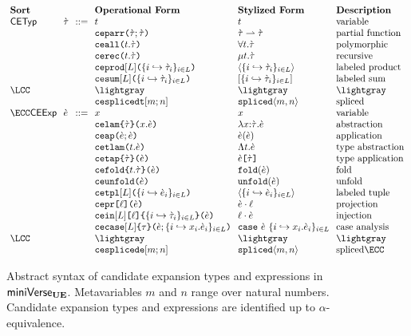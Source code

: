 \begin{enumerate}
\begin{figure}[p]
\hspace{-5px}$\arraycolsep=3.5pt\begin{array}{lllllll}
\textbf{Sort} & & & \textbf{Operational Form} & \textbf{Stylized Form} & \textbf{Description}\\
\mathsf{CETyp} & \ctau & ::= & t & t & \text{variable}\\
&&& \aceparr{\ctau}{\ctau} & \parr{\ctau}{\ctau} & \text{partial function}\\
&&& \aceall{t}{\ctau} & \forallt{t}{\ctau} & \text{polymorphic}\\
&&& \acerec{t}{\ctau} & \rect{t}{\ctau} & \text{recursive}\\
&&& \aceprod{\labelset}{\mapschema{\ctau}{i}{\labelset}} & \prodt{\mapschema{\ctau}{i}{\labelset}} & \text{labeled product}\\
&&& \acesum{\labelset}{\mapschema{\ctau}{i}{\labelset}} & \sumt{\mapschema{\ctau}{i}{\labelset}} & \text{labeled sum}\\
\LCC &&& \lightgray & \lightgray & \lightgray\\
&&& \acesplicedt{m}{n} & \splicedt{m}{n} & \text{spliced}\\\ECC
\mathsf{CEExp} & \ce & ::= & x & x & \text{variable}\\
&&& \acelam{\ctau}{x}{\ce} & \lam{x}{\ctau}{\ce} & \text{abstraction}\\
&&& \aceap{\ce}{\ce} & \ap{\ce}{\ce} & \text{application}\\
&&& \acetlam{t}{\ce} & \Lam{t}{\ce} & \text{type abstraction}\\
&&& \acetap{\ce}{\ctau} & \App{\ce}{\ctau} & \text{type application}\\
&&& \acefold{t}{\ctau}{\ce} & \fold{\ce} & \text{fold}\\
&&& \aceunfold{\ce} & \unfold{\ce} & \text{unfold}\\
&&& \acetpl{\labelset}{\mapschema{\ce}{i}{\labelset}} & \tpl{\mapschema{\ce}{i}{\labelset}} & \text{labeled tuple}\\
&&& \acepr{\ell}{\ce} & \prj{\ce}{\ell} & \text{projection}\\
&&& \acein{\labelset}{\ell}{\mapschema{\ctau}{i}{\labelset}}{\ce} & \inj{\ell}{\ce} & \text{injection}\\
&&& \acecase{\labelset}{\tau}{\ce}{\mapschemab{x}{\ce}{i}{\labelset}} & \caseof{\ce}{\mapschemab{x}{\ce}{i}{\labelset}} & \text{case analysis}\\
\LCC &&& \lightgray & \lightgray & \lightgray\\
&&& \acesplicede{m}{n} & \splicede{m}{n} & \text{spliced}\ECC
\end{array}$
\caption[Syntax of candidate expansion types and expressions in $\miniVerseUE$]{Abstract syntax of candidate expansion types and expressions in $\miniVerseUE$. Metavariables $m$ and $n$ range over natural numbers. Candidate expansion types and expressions are identified up to $\alpha$-equivalence.}
\label{fig:U-candidate-terms}
\end{figure}





\end{enumerate}
